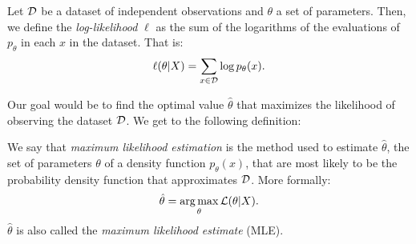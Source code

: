\begin{ndef}
Let $\mathcal{D}$ be a dataset of independent observations and $\theta$ a set of parameters. Then, we define the \emph{log-likelihood} $\ell$ as the sum of the logarithms of the evaluations of $p_\theta$ in each $x$ in the dataset. That is:
\[
\ell (\theta | X) = \sum_{x \in \mathcal{D}} \log p_\theta(x).
\]
\end{ndef}

Our goal would be to find the optimal value $\hat{\theta}$ that maximizes the likelihood of observing the dataset $\mathcal{D}$. We get to the following definition:

\begin{ndef}
We say that \emph{maximum likelihood estimation} is the method used to estimate $\hat \theta$, the set of parameters $\theta$ of a density function
$p_\theta (x)$, that are most likely to be the probability density function that approximates $\mathcal{D}$. More formally:
$$
\hat \theta = \operatorname*{arg\,max}_{\theta} \mathcal L(\theta|X).
$$
$\hat\theta$ is also called the \emph{maximum likelihood estimate} (MLE).
\end{ndef}
